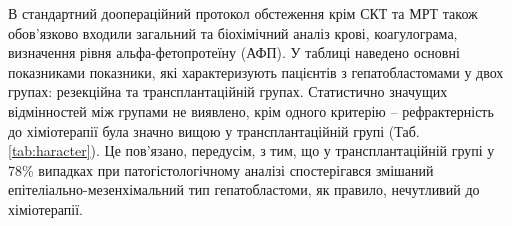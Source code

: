 \begin{table}[]
\centering
\caption{Розподілення пацієнтів по стадії PRETEXT }
\label{tab:pretexpvfc}
\end{table}

В стандартний доопераційний протокол обстеження крім СКТ та МРТ також обов’язково входили загальний та біохімічний аналіз крові, коагулограма, визначення рівня альфа-фетопротеїну (АФП). У таблиці наведено основні показниками показники, які характеризують пацієнтів  з гепатобластомами у двох групах: резекційна та трансплантаційній групах. Статистично значущих відмінностей між групами не виявлено, крім одного критерію – рефрактерність до хіміотерапії була значно вищою у трансплантаційній групі (Таб. \ref{tab:haracter}). Це пов’язано, передусім, з тим, що у трансплантаційній групі у 78\% випадках при патогістологічному аналізі спостерігався змішаний епітеліально-мезенхімальний тип гепатобластоми, як правило, нечутливий до хіміотерапії. 


